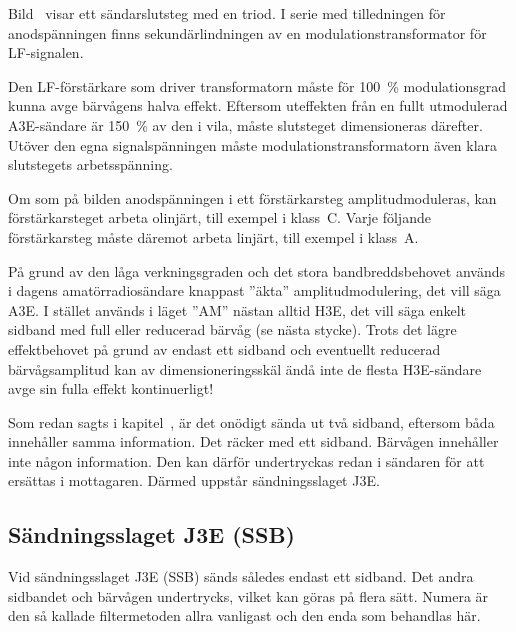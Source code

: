 
Bild~ visar ett sändarslutsteg med en triod.
I serie med tilledningen för anodspänningen finns sekundärlindningen av en
modulationstransformator för LF-signalen.

Den LF-förstärkare som driver transformatorn måste för \qty{100}{\percent}
modulationsgrad kunna avge bärvågens halva effekt.
Eftersom uteffekten från en fullt utmodulerad A3E-sändare är \qty{150}{\percent}
av den i vila, måste slutsteget dimensioneras därefter.
Utöver den egna signalspänningen måste modulationstransformatorn även klara
slutstegets arbetsspänning.

Om som på bilden anodspänningen i ett förstärkarsteg amplitudmoduleras,
kan förstärkarsteget arbeta olinjärt, till exempel i klass~C.
Varje följande förstärkarsteg måste däremot arbeta linjärt, till exempel i
klass~A.

På grund av den låga verkningsgraden och det stora bandbreddsbehovet används i
dagens amatörradiosändare knappast ''äkta'' amplitudmodulering,
det vill säga A3E.
I stället används i läget ''AM'' nästan alltid H3E, det vill säga enkelt
sidband med full eller reducerad bärvåg (se nästa stycke).
Trots det lägre effektbehovet på grund av endast ett sidband och eventuellt
reducerad bärvågsamplitud kan av dimensioneringsskäl ändå inte de flesta
H3E-sändare avge sin fulla effekt kontinuerligt!

Som redan sagts i kapitel~, är det onödigt sända ut två
sidband, eftersom båda innehåller samma information.
Det räcker med ett sidband.
Bärvågen innehåller inte någon information.
Den kan därför undertryckas redan i sändaren för att ersättas i mottagaren.
Därmed uppstår sändningsslaget J3E.

\newpage
\subsection{Sändningsslaget J3E (SSB)}

Vid sändningsslaget J3E (SSB) sänds således endast ett sidband.
Det andra sidbandet och bärvågen undertrycks, vilket kan göras på flera sätt.
Numera är den så kallade filtermetoden allra vanligast och den enda som
behandlas här.


